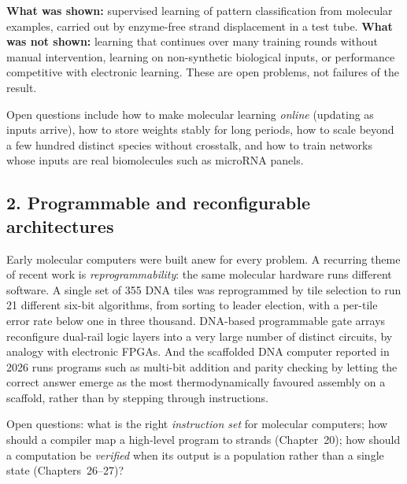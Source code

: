 \begin{Frontier}
\textbf{What was shown:} supervised learning of pattern classification from
molecular examples, carried out by enzyme-free strand displacement in a test
tube.\cite{CherryQian2025} \textbf{What was not shown:} learning that
continues over many training rounds without manual intervention, learning on
non-synthetic biological inputs, or performance competitive with electronic
learning. These are open problems, not failures of the result.
\end{Frontier}

Open questions include how to make molecular learning \emph{online} (updating as
inputs arrive), how to store weights stably for long periods, how to scale beyond
a few hundred distinct species without crosstalk, and how to train networks
whose inputs are real biomolecules such as microRNA panels.

\subsection*{2. Programmable and reconfigurable architectures}
Early molecular computers were built anew for every problem. A recurring theme
of recent work is \emph{reprogrammability}: the same molecular hardware runs
different software. A single set of 355 DNA tiles was reprogrammed by tile
selection to run 21 different six-bit algorithms, from sorting to leader
election, with a per-tile error rate below one in three thousand.\cite{Woods2019}
DNA-based programmable gate arrays reconfigure dual-rail logic layers into a
very large number of distinct circuits, by analogy with electronic FPGAs.\cite{Lv2023}
And the scaffolded DNA computer reported in 2026 runs programs such as
multi-bit addition and parity checking by letting the correct answer emerge as
the most thermodynamically favoured assembly on a scaffold, rather than by
stepping through instructions.\cite{Sterin2026}

Open questions: what is the right \emph{instruction set} for molecular
computers; how should a compiler map a high-level program to strands
(Chapter~20); how should a computation be \emph{verified} when its output is a
population rather than a single state (Chapters~26--27)?

